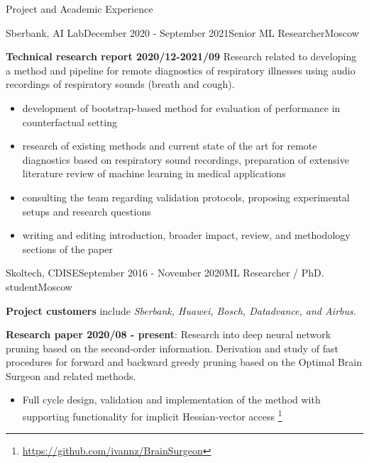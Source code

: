 \documentclass{resume} %
\begin{document}
\begin{rSection}{Project and Academic Experience}
\begin{rSubsection}{Sberbank, AI Lab}{December 2020 - September 2021}{Senior ML Researcher}{Moscow}
    \item \textbf{Technical research report 2020/12-2021/09}
    Research related to developing a method and pipeline for remote diagnostics of respiratory
    illnesses using audio recordings of respiratory sounds (breath and cough).
    \begin{itemize}
        \item development of bootstrap-based method for evaluation of performance in
        counterfactual setting  %
        
        \item research of existing methods and current state of the art for remote diagnostics
        based on respiratory sound recordings, preparation of extensive literature review of
        machine learning in medical applications
        
        \item consulting the team regarding validation protocols, proposing experimental
        setups and research questions
        
        \item writing and editing introduction, broader impact, review, and methodology sections 
        of the paper
    \end{itemize}
\end{rSubsection}

\begin{rSubsection}{Skoltech, CDISE}{September 2016 - November 2020}{ML Researcher / PhD. student}{Moscow}
    \item \textbf{Project customers} include \emph{Sberbank, Huawei, Bosch, Datadvance, and Airbus}.

    \bigskip
    \item \textbf{Research paper 2020/08 - present}:
    Research into deep neural network pruning based on the second-order information.
    Derivation and study of fast procedures for forward and backward greedy pruning based
    on the Optimal Brain Surgeon and related methods.
    \begin{itemize}
        \item Full cycle design, validation and implementation of the method with supporting
        functionality for implicit Hessian-vector access%
            \footnote{\url{https://github.com/ivannz/BrainSurgeon}}


\end{itemize}
\end{rSubsection}
\end{rSection}
\end{document}
